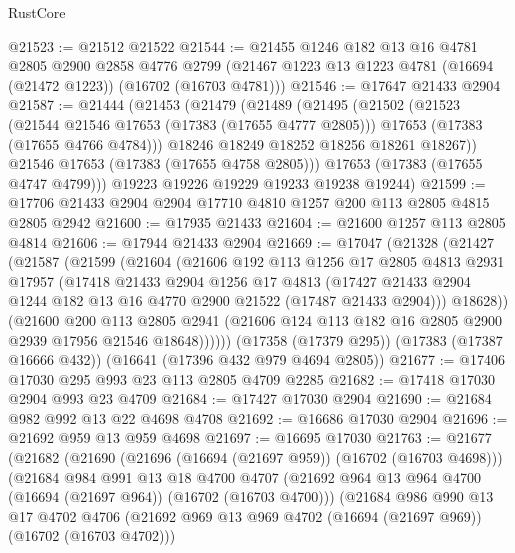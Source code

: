 \begin{lexlean}{RustCore}
\begin{coremodule}
@21523 := @21512 @21522
@21544 := @21455
    @1246
    @182
    @13
    @16
    @4781
    @2805
    @2900
    @2858
    @4776
    @2799
    (@21467 @1223 @13 @1223 @4781 (@16694 (@21472 @1223)) (@16702 (@16703 @4781)))
@21546 := @17647 @21433 @2904
@21587 := @21444
    (@21453
      (@21479
        (@21489
          (@21495
            (@21502
              (@21523
                (@21544 @21546 @17653 (@17383 (@17655 @4777 @2805)))
                @17653
                (@17383 (@17655 @4766 @4784)))
              @18246
              @18249
              @18252
              @18256
              @18261
              @18267))
          @21546
          @17653
          (@17383 (@17655 @4758 @2805)))
        @17653
        (@17383 (@17655 @4747 @4799)))
      @19223
      @19226
      @19229
      @19233
      @19238
      @19244)
@21599 := @17706 @21433 @2904 @2904 @17710 @4810 @1257 @200 @113 @2805 @4815 @2805 @2942
@21600 := @17935 @21433
@21604 := @21600 @1257 @113 @2805 @4814
@21606 := @17944 @21433 @2904
@21669 := @17047
    (@21328
      (@21427
        (@21587
          (@21599
            (@21604
              (@21606
                @192
                @113
                @1256
                @17
                @2805
                @4813
                @2931
                @17957
                (@17418
                  @21433
                  @2904
                  @1256
                  @17
                  @4813
                  (@17427 @21433 @2904 @1244 @182 @13 @16 @4770 @2900 @21522 (@17487 @21433 @2904)))
                @18628))
            (@21600
              @200
              @113
              @2805
              @2941
              (@21606 @124 @113 @182 @16 @2805 @2900 @2939 @17956 @21546 @18648))))))
    (@17358 (@17379 @295))
    (@17383 (@17387 @16666 @432))
    (@16641 (@17396 @432 @979 @4694 @2805))
@21677 := @17406 @17030 @295 @993 @23 @113 @2805 @4709 @2285
@21682 := @17418 @17030 @2904 @993 @23 @4709
@21684 := @17427 @17030 @2904
@21690 := @21684 @982 @992 @13 @22 @4698 @4708
@21692 := @16686 @17030 @2904
@21696 := @21692 @959 @13 @959 @4698
@21697 := @16695 @17030
@21763 := @21677
    (@21682
      (@21690
        (@21696 (@16694 (@21697 @959)) (@16702 (@16703 @4698)))
        (@21684
          @984
          @991
          @13
          @18
          @4700
          @4707
          (@21692 @964 @13 @964 @4700 (@16694 (@21697 @964)) (@16702 (@16703 @4700)))
          (@21684
            @986
            @990
            @13
            @17
            @4702
            @4706
            (@21692 @969 @13 @969 @4702 (@16694 (@21697 @969)) (@16702 (@16703 @4702)))

\end{coremodule}
\end{lexlean}
